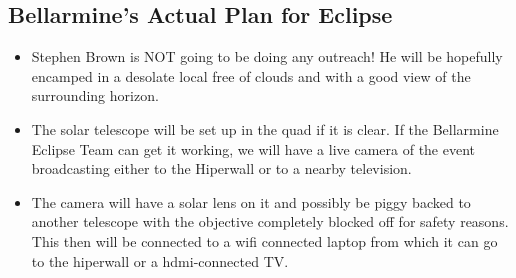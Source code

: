 \documentclass{article}
\begin{document}

\subsection{Bellarmine's Actual Plan for Eclipse}
\begin{itemize}
\item Stephen Brown is NOT going to be doing any outreach!  He will be hopefully encamped in a desolate local free of clouds and with a good view of the surrounding horizon.
\item The solar telescope will be set up in the quad if it is clear.  If the Bellarmine Eclipse Team can get it working, we will have a live camera of the event broadcasting either to the Hiperwall or to a nearby television.
\item The camera will have a solar lens on it and possibly be piggy backed to another telescope with the objective completely blocked off for safety reasons.  This then will be connected to a wifi connected laptop from which it can go to the hiperwall or a hdmi-connected TV. 
\end{itemize}
\end{document}
